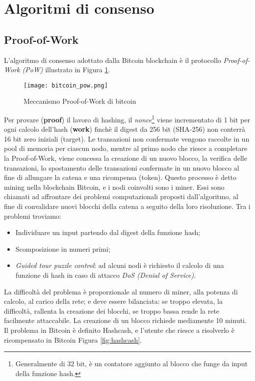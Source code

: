 \section{Algoritmi di consenso}
\subsection{Proof-of-Work}
L'algoritmo di consenso adottato dalla Bitcoin blockchain è il protocollo \textit{Proof-of-Work (PoW)} illustrato in Figura \ref{fig:bitcoin_pow}.

\begin{figure}[htbp]
  \centering
  \texttt{[image: bitcoin\_pow.png]}
  \caption{Meccanismo Proof-of-Work di bitcoin}
  \label{fig:bitcoin_pow}
\end{figure}

Per provare (\textbf{proof}) il lavoro di hashing, il \textit{nonce}\footnote{Generalmente di 32 bit, è un contatore aggiunto al blocco che funge da input della funzione hash.} viene incrementato di 1 bit per ogni calcolo dell'hash (\textbf{work}) finchè il digest da 256 bit (SHA-256) non conterrà 16 bit zero iniziali (target).
Le transazioni non confermate vengono raccolte in un pool di memoria per ciascun nodo, mentre al primo nodo che riesce a completare la Proof-of-Work, viene concessa la creazione di un nuovo blocco, la verifica delle transazioni, lo spostamento delle transazioni confermate in un nuovo blocco al fine di allungare la catena e una ricompensa (token). Questo processo è detto mining nella blockchain Bitcoin, e i nodi coinvolti sono i miner. Essi sono chiamati ad affrontare dei problemi computazionali proposti dall'algoritmo, al fine di convalidare nuovi blocchi della catena a seguito della loro risoluzione. Tra i problemi troviamo:

\begin{itemize}
  \item Individuare un input partendo dal digest della funzione hash;
  \item Scomposizione in numeri primi;
  \item \textit{Guided tour puzzle control}: ad alcuni nodi è richiesto il calcolo di una funzione di hash in caso di attacco \textit{DoS (Denial of Service)}.
\end{itemize}

La difficoltà del problema è proporzionale al numero di miner, alla potenza di calcolo, al carico della rete; e deve essere bilanciata: se troppo elevata, la difficoltà, rallenta la creazione dei blocchi, se troppo bassa rende la rete facilmente attaccabile. La creazione di un blocco richiede mediamente 10 minuti. Il problema in Bitcoin è definito Hashcash, e l'utente che riesce a risolverlo è ricompensato in Bitcoin Figura \ref{fig:hashcash}.

